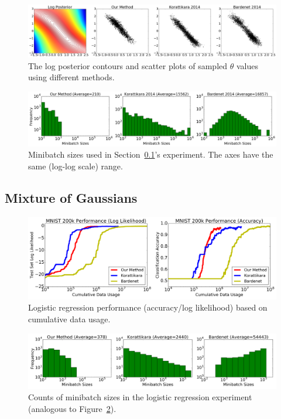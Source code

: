 \documentclass[twoside]{article} \usepackage{aistats2017}
\begin{document}
\begin{figure}[t]
    \centering
    \includegraphics[width=0.8\linewidth]{GaussianMixtureResult/posterior_of_gaussian.png}
    \caption{
    The log posterior contours and scatter plots of sampled $\theta$ values
    using different methods. 
    }
    \label{fig:gauss_mix_1}
\end{figure}
\begin{figure}[t]
    \centering
    \includegraphics[width=0.8\linewidth]{minibatch_size_gaussian.png}
    \caption{
    Minibatch sizes used in Section~\ref{ssec:gaussians}'s experiment. The axes
    have the same (log-log scale) range.
    }
    \label{fig:gauss_mix_2}
\end{figure}


\subsection{Mixture of Gaussians}\label{ssec:gaussians}

\begin{figure}[t]
	\centering
	\includegraphics[width=0.8\linewidth]{logistic_regression_ll_acc_results.png}
	\caption{
    Logistic regression performance (accuracy/log likelihood) based on
    cumulative data usage.
    }
	\label{fig:logistic_performance}
\end{figure}
\begin{figure}[t]
	\centering
	\includegraphics[width=0.8\linewidth]{logistic_regression_histograms_results.png}
	\caption{
    Counts of minibatch sizes in the logistic regression experiment (analogous
    to Figure~\ref{fig:gauss_mix_2}).
    }
	\label{fig:logistic_minibatch}
\end{figure}
\end{document}
